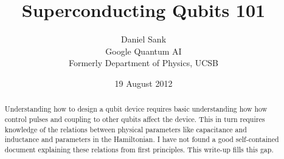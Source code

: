 \documentclass[twocolumn]{article}
\title{Superconducting Qubits 101}
\author{Daniel Sank \\
\small Google Quantum AI \\
\small Formerly Department of Physics, UCSB}
\date{19 August 2012}
\begin{document}
\maketitle
\tableofcontents

\begin{abstract}
Understanding how to design a qubit device requires basic understanding how how control pulses and coupling to other qubits affect the device.
This in turn requires knowledge of the relations between physical parameters like capacitance and inductance and parameters in the Hamiltonian.
I have not found a good self-contained document explaining these relations from first principles.
This write-up fills this gap.
\end{abstract}





\end{document}
